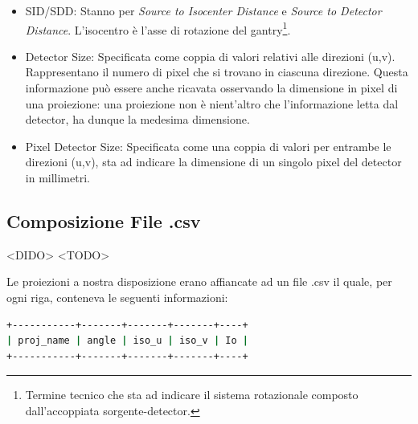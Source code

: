 \documentclass[a4paper,11pt, oneside]{article}
\begin{document}
                    \begin{itemize}
                        \item SID/SDD: Stanno per \textit{Source to Isocenter Distance} e \textit{Source to Detector Distance}. L'isocentro è l'asse di rotazione del gantry\footnote{Termine tecnico che sta ad indicare il sistema rotazionale composto dall'accoppiata sorgente-detector.}.
                        \item Detector Size: Specificata come coppia di valori relativi alle direzioni (u,v). Rappresentano il numero di pixel che si trovano in ciascuna direzione. Questa informazione può essere anche ricavata osservando la dimensione in pixel di una proiezione: una proiezione non è nient'altro che l'informazione letta dal detector, ha dunque la medesima dimensione.
                        \item Pixel Detector Size: Specificata come una coppia di valori per entrambe le direzioni (u,v), sta ad indicare la dimensione di un singolo pixel del detector in millimetri.
                    \end{itemize}
                    
                    
            
            \subsection{Composizione File .csv}
                \label{sub:csv}
                <DIDO> <TODO>
                \par
                    Le proiezioni a nostra disposizione erano affiancate ad un file .csv il quale, per ogni riga, conteneva le seguenti informazioni:
                    \begin{lstlisting}[language=bash, frame=bt]
+-----------+-------+-------+-------+----+
| proj_name | angle | iso_u | iso_v | Io |
+-----------+-------+-------+-------+----+
                    \end{lstlisting}
                    
\end{document}
